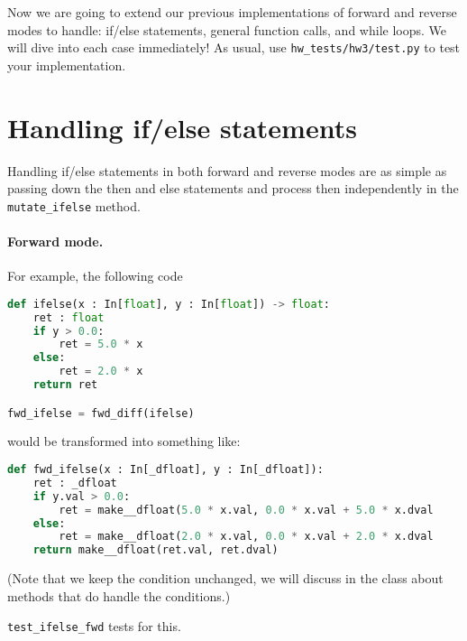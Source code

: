 




Now we are going to extend our previous implementations of forward and reverse modes to handle: if/else statements, general function calls, and while loops. We will dive into each case immediately! As usual, use \lstinline{hw_tests/hw3/test.py} to test your implementation.

\section{Handling if/else statements}

Handling if/else statements in both forward and reverse modes are as simple as passing down the then and else statements and process then independently in the \lstinline{mutate_ifelse} method. 

\paragraph{Forward mode.} For example, the following code
\begin{lstlisting}[language=Python]
def ifelse(x : In[float], y : In[float]) -> float:
    ret : float
    if y > 0.0:
        ret = 5.0 * x
    else:
        ret = 2.0 * x
    return ret

fwd_ifelse = fwd_diff(ifelse)
\end{lstlisting}
would be transformed into something like:
\begin{lstlisting}[language=Python]
def fwd_ifelse(x : In[_dfloat], y : In[_dfloat]):
    ret : _dfloat
    if y.val > 0.0:
        ret = make__dfloat(5.0 * x.val, 0.0 * x.val + 5.0 * x.dval
    else:
        ret = make__dfloat(2.0 * x.val, 0.0 * x.val + 2.0 * x.dval
    return make__dfloat(ret.val, ret.dval)
\end{lstlisting}
(Note that we keep the condition unchanged, we will discuss in the class about methods that do handle the conditions.)

\lstinline{test_ifelse_fwd} tests for this.

